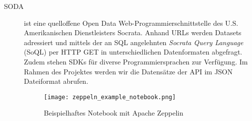 \begin{description}
	\item[\ac{SODA}] ist eine quelloffene Open Data Web-Programmierschnittstelle des U.S. Amerikanischen Dienstleisters Socrata. Anhand URLs werden Datasets adressiert und mittels der an SQL angelehnten \textit{Socrata Query Language} (SoQL) per HTTP GET in unterschiedlichen Datenformaten abgefragt. Zudem stehen SDKs für diverse Programmiersprachen zur Verfügung. Im Rahmen des Projektes werden wir die Datensätze der \ac{API} im \ac{JSON} Dateiformat abrufen.\autocite{soda.api}
	\begin{figure}[h]
		\centering
		\texttt{[image: zeppeln\_example\_notebook.png]}
		\caption[Beispielhaftes Notebook mit Apache Zeppelin]{Beispielhaftes Notebook mit Apache Zeppelin\autocite{zeppelin.image}}
		\label{fig:zeppeln_example_notebook}
	\end{figure}
\end{description}
